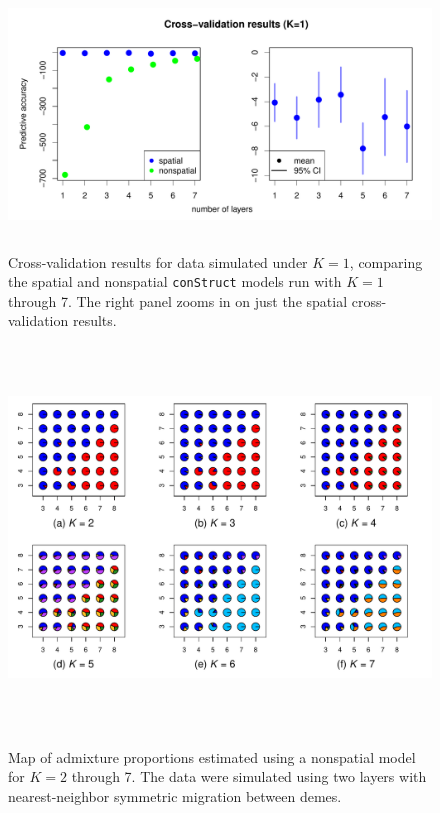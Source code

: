 \documentclass[12pt]{article}
\begin{document}
\begin{figure}
	\centering
		{\includegraphics[width=5in,height=2.5in]{figs/sims/simK1_std_xval.pdf}}
		\caption{
			Cross-validation results for data simulated under $K=1$,
			comparing the spatial and nonspatial \texttt{conStruct} models run with $K=1$ through 7.  
			The right panel zooms in on just the spatial cross-validation results.
		}\label{simK1_xval}
\end{figure}


\newpage
\begin{figure}
	\centering
		{\includegraphics[width=6in,height=4in]{figs/sims/simK2_nsp_pies.pdf}}
	\caption{
	Map of admixture proportions estimated using a nonspatial model for $K=2$ through 7.
	The data were simulated using two layers with nearest-neighbor symmetric migration between demes.
    }\label{simK2_nsp_pies}
\end{figure}
\end{document}
